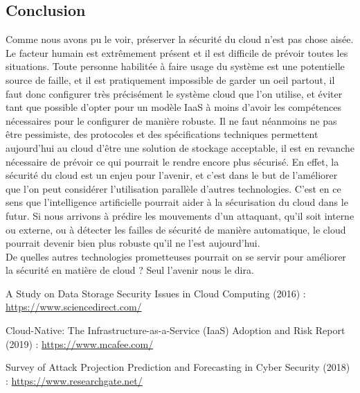 \documentclass[a4paper, 12pt]{article}
\begin{document}
\begin{spacing}{1.1}
  \section{Conclusion}
    Comme nous avons pu le voir, préserver la sécurité du cloud n'est pas chose
    aisée. Le facteur humain est extrêmement présent et il est difficile de
    prévoir toutes les situations. Toute personne habilitée à faire usage du
    système est une potentielle source de faille, et il est pratiquement
    impossible de garder un oeil partout, il faut donc configurer très
    précisément le système cloud que l'on utilise, et éviter tant que possible
    d'opter pour un modèle IaaS à moins d'avoir les compétences nécessaires pour
    le configurer de manière robuste. Il ne faut néanmoins ne pas être
    pessimiste, des protocoles et des spécifications techniques permettent
    aujourd'hui au cloud d'être une solution de stockage acceptable, il est en
    revanche nécessaire de prévoir ce qui pourrait le rendre encore plus
    sécurisé. En effet, la sécurité du cloud est un enjeu pour l'avenir, et
    c'est dans le but de l'améliorer que l'on peut considérer l'utilisation
    parallèle d'autres technologies. C'est en ce sens que l'intelligence
    artificielle pourrait aider à la sécurisation du cloud dans le futur. Si
    nous arrivons à prédire les mouvements d'un attaquant, qu'il soit interne ou
    externe, ou à détecter les failles de sécurité de manière automatique, le
    cloud pourrait devenir bien plus robuste qu'il ne l'est aujourd'hui. \\

    De quelles autres technologies prometteuses pourrait on se servir pour
    améliorer la sécurité en matière de cloud ? Seul l'avenir nous le dira.

  \newpage
  \begin{thebibliography}{3}
    A Study on Data Storage Security Issues in Cloud Computing (2016) : \href{https://www.sciencedirect.com/science/article/pii/S1877050916315812}{https://www.sciencedirect.com/}

    Cloud-Native: The Infrastructure-as-a-Service (IaaS) Adoption and Risk
    Report (2019) : \href{https://www.mcafee.com/enterprise/en-us/assets/reports/restricted/rp-cloud-adoption-risk-report-iaas.pdf}{https://www.mcafee.com/}

    Survey of Attack Projection Prediction and Forecasting in Cyber Security
    (2018) : \href{https://www.researchgate.net/publication/327449459_Survey_of_Attack_Projection_Prediction_and_Forecasting_in_Cyber_Security}{https://www.researchgate.net/}


\end{thebibliography}
\end{spacing}
\end{document}

